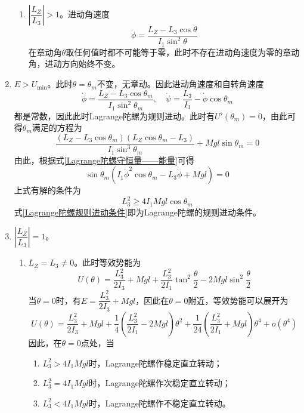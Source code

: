 \begin{enumerate}
\begin{enumerate}
		\item $\left|\dfrac{L_Z}{L_3}\right| > 1$。进动角速度
		\begin{equation*}
			\dot{\phi} = \frac{L_Z - L_3 \cos \theta}{I_1 \sin^2 \theta}
		\end{equation*}
		在章动角$\theta$取任何值时都不可能等于零，此时不存在进动角速度为零的章动角，进动方向始终不变。
	\end{enumerate}
	\item $E>U_{\min}$。此时$\theta = \theta_m$不变，无章动。因此进动角速度和自转角速度
	\begin{equation*}
		\dot{\phi} = \frac{L_Z-L_3\cos \theta_m}{I_1\sin^2 \theta_m},\quad \dot{\psi} = \frac{L_3}{I_3} - \dot{\phi}\cos \theta_m
	\end{equation*}
	都是常数，因此此时Lagrange陀螺为规则进动。此时有$U'(\theta_m) = 0$，由此可得$\theta_m$满足的方程为
	\begin{equation*}
		\frac{(L_Z-L_3\cos \theta_m)(L_Z\cos \theta_m-L_3)}{I_1 \sin^3 \theta_m} + Mgl\sin \theta_m = 0
	\end{equation*}
	由此，根据式\eqref{Lagrange陀螺守恒量——能量}可得
	\begin{equation*}
		\sin \theta_m (I_1 \dot{\phi}^2 \cos \theta_m - L_3 \dot{\phi} + Mgl) = 0
	\end{equation*}
	上式有解的条件为
	\begin{equation}
		L_3^2 \geqslant 4I_1 Mgl\cos \theta_m
		\label{Lagrange陀螺规则进动条件}
	\end{equation}
	式\eqref{Lagrange陀螺规则进动条件}即为Lagrange陀螺的规则进动条件。
	\item $\left|\dfrac{L_Z}{L_3}\right| = 1$。
	\begin{enumerate}
		\item $L_Z = L_3 \neq 0$。此时等效势能为
		\begin{equation*}
			U(\theta) = \frac{L_3^2}{2I_3} + Mgl + \frac{L_3^2}{2I_1} \tan^2 \frac{\theta}{2} - 2Mgl\sin^2 \frac{\theta}{2}
		\end{equation*}
		当$\theta=0$时，有$E = \dfrac{L_3^2}{2I_3}+Mgl$，因此在$\theta=0$附近，等效势能可以展开为
		\begin{equation*}
			U(\theta) = \frac{L_3^2}{2I_3} + Mgl + \frac14 \left(\frac{L_3^2}{2I_1} - 2Mgl\right) \theta^2 + \frac{1}{24} \left(\frac{L_3^2}{2I_1}+Mgl\right) \theta^4 + o(\theta^4)
		\end{equation*}
		因此，在$\theta = 0$点处，当
		\begin{enumerate}
			\item $L_3^2 > 4I_1Mgl$时，Lagrange陀螺作稳定直立转动；
			\item $L_3^2 = 4I_1Mgl$时，Lagrange陀螺作次稳定直立转动；
			\item $L_3^2 < 4I_1Mgl$时，Lagrange陀螺作不稳定直立转动。
		\end{enumerate}
	

\end{enumerate}
\end{enumerate}
